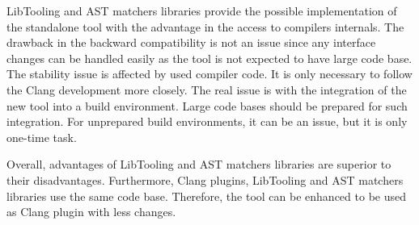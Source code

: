 LibTooling and AST matchers libraries provide the possible implementation of the standalone tool with the advantage in the access to compilers internals. The drawback in the backward compatibility is not an issue since any interface changes can be handled easily as the tool is not expected to have large code base. The stability issue is affected by used compiler code. It is only necessary to follow the Clang development more closely. The real issue is with the integration of the new tool into a build environment. Large code bases should be prepared for such integration. For unprepared build environments, it can be an issue, but it is only one-time task.

Overall, advantages of LibTooling and AST matchers libraries are superior to their disadvantages. Furthermore, Clang plugins, LibTooling and AST matchers libraries use the same code base. Therefore, the tool can be enhanced to be used as Clang plugin with less changes.